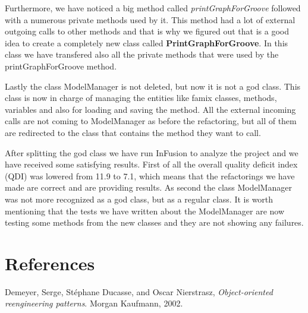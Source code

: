 \documentclass{article}
\begin{document}
Furthermore, we have noticed a big method called \emph{printGraphForGroove} followed with a numerous private methods used by it. This method had a lot of external outgoing calls to other methods and that is why we figured out that is a good idea to create a completely new class called \textbf{PrintGraphForGroove}. In this class we have transfered also all the private methods that were used by the printGraphForGroove method.

Lastly the class ModelManager is not deleted, but now it is not a god class. This class is now in charge of managing the entities like famix classes, methods, variables and also for loading and saving the method. All the external incoming calls are not coming to ModelManager as before the refactoring, but all of them are redirected to the class that contains the method they want to call.

After splitting the god class we have run InFusion to analyze the project and we have received some satisfying results. First of all the overall quality deficit index (QDI) was lowered from 11.9 to 7.1, which means that the refactorings we have made are correct and are providing results. As second the class ModelManager was not more recognized as a god class, but as a regular class. It is worth mentioning that the tests we have written about the ModelManager are now testing some methods from the new classes and they are not showing any failures.

\newpage
\section{References}
\begin{thebibliography}{9}

	Demeyer, Serge, St{\'e}phane Ducasse, and Oscar Nierstrasz,
	\emph{Object-oriented reengineering patterns}. 
	Morgan Kaufmann, 
	2002.

\end{thebibliography}
\end{document}
